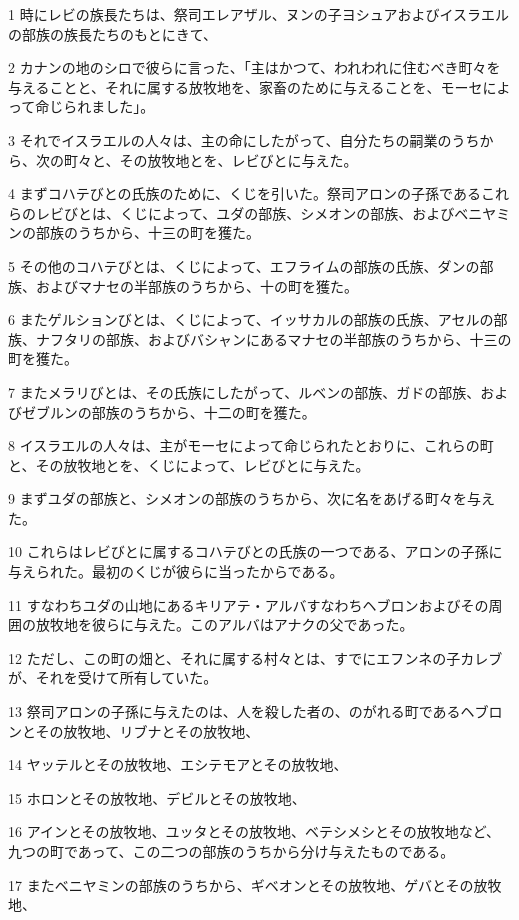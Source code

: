 \par 1 時にレビの族長たちは、祭司エレアザル、ヌンの子ヨシュアおよびイスラエルの部族の族長たちのもとにきて、
\par 2 カナンの地のシロで彼らに言った、「主はかつて、われわれに住むべき町々を与えることと、それに属する放牧地を、家畜のために与えることを、モーセによって命じられました」。
\par 3 それでイスラエルの人々は、主の命にしたがって、自分たちの嗣業のうちから、次の町々と、その放牧地とを、レビびとに与えた。
\par 4 まずコハテびとの氏族のために、くじを引いた。祭司アロンの子孫であるこれらのレビびとは、くじによって、ユダの部族、シメオンの部族、およびベニヤミンの部族のうちから、十三の町を獲た。
\par 5 その他のコハテびとは、くじによって、エフライムの部族の氏族、ダンの部族、およびマナセの半部族のうちから、十の町を獲た。
\par 6 またゲルションびとは、くじによって、イッサカルの部族の氏族、アセルの部族、ナフタリの部族、およびバシャンにあるマナセの半部族のうちから、十三の町を獲た。
\par 7 またメラリびとは、その氏族にしたがって、ルベンの部族、ガドの部族、およびゼブルンの部族のうちから、十二の町を獲た。
\par 8 イスラエルの人々は、主がモーセによって命じられたとおりに、これらの町と、その放牧地とを、くじによって、レビびとに与えた。
\par 9 まずユダの部族と、シメオンの部族のうちから、次に名をあげる町々を与えた。
\par 10 これらはレビびとに属するコハテびとの氏族の一つである、アロンの子孫に与えられた。最初のくじが彼らに当ったからである。
\par 11 すなわちユダの山地にあるキリアテ・アルバすなわちヘブロンおよびその周囲の放牧地を彼らに与えた。このアルバはアナクの父であった。
\par 12 ただし、この町の畑と、それに属する村々とは、すでにエフンネの子カレブが、それを受けて所有していた。
\par 13 祭司アロンの子孫に与えたのは、人を殺した者の、のがれる町であるヘブロンとその放牧地、リブナとその放牧地、
\par 14 ヤッテルとその放牧地、エシテモアとその放牧地、
\par 15 ホロンとその放牧地、デビルとその放牧地、
\par 16 アインとその放牧地、ユッタとその放牧地、ベテシメシとその放牧地など、九つの町であって、この二つの部族のうちから分け与えたものである。
\par 17 またベニヤミンの部族のうちから、ギベオンとその放牧地、ゲバとその放牧地、
